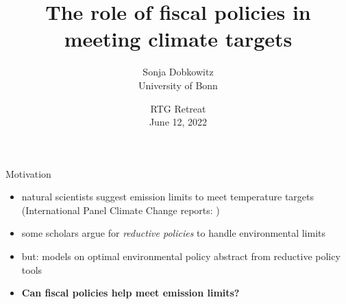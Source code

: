 \documentclass[11pt,aspectratio=169]{beamer}
\author[Sonja Dobkowitz]{\small Sonja Dobkowitz\\ \footnotesize{University of Bonn%
	}\\ }
\title{The role of fiscal policies in meeting climate targets}
\date{\small{RTG Retreat\\ June 12, 2022 }}
\begin{document}
	
	{
		\begin{frame}
		\titlepage
	\end{frame}
}



\addtocounter{framenumber}{-1}
\begin{frame}{Motivation}

\begin{itemize}[<+-| alert@+>]
	\item 	natural scientists suggest emission limits to meet temperature targets \\ \small{(International Panel Climate Change reports: \cite{Rogelj2018MitigationDevelopment., IPCC2022})}
\vspace{3mm}
	\item some scholars argue for \textit{reductive policies} to handle environmental limits\\ \small{\citep{Schor2005SustainableReduction, Arrow2004AreMuch, Dasgupta2021}}
	\vspace{3mm}
	\item but: models on optimal environmental policy abstract from reductive policy tools %
	\vspace{3mm}
\item \textbf{Can fiscal policies help meet emission limits?}
\end{itemize}
\end{frame}
\end{document}

